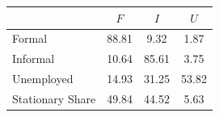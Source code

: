 \begin{table}[htbp]
\centering
\label{tab:transitions}
\small
\begin{tabular}{lccc}
\toprule
 & $F$ & $I$ & $U$ \\
\midrule
Formal & 88.81 & 9.32 & 1.87 \\
Informal & 10.64 & 85.61 & 3.75 \\
Unemployed & 14.93 & 31.25 & 53.82 \\
\midrule
Stationary Share & 49.84 & 44.52 & 5.63 \\
\bottomrule
\end{tabular}
\end{table}
